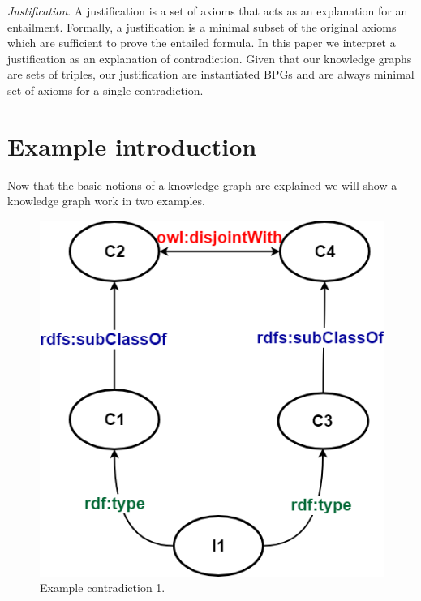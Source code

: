 \documentclass[11pt,letterpaper ,oneside ]{book}
\begin{document}
\textit{Justification}. A justification\cite{Horridge:2009} is a set of axioms that acts as an explanation for an entailment.
Formally, a justification is a minimal subset of the original axioms which are sufficient to prove the entailed formula. In this paper we interpret a justification as an explanation of contradiction. Given that our knowledge graphs are sets of triples, our justification are instantiated BPGs and are always minimal set of axioms for a single contradiction. \\

\section{Example introduction}
Now that the basic notions of a knowledge graph are explained we will show a knowledge graph work in two examples. 
\begin{figure}
	\centering
	\includegraphics[width=\linewidth]{images/Example1.png}
	\caption{Example contradiction 1.}
	\label{fig:Example1}
\end{figure}
\end{document}
